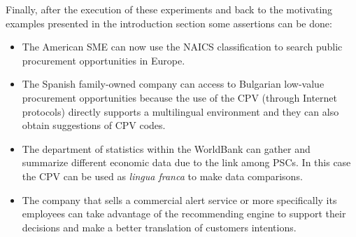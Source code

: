 Finally, after the execution of these experiments and back to the motivating examples 
presented in the introduction section some assertions can be done:
\begin{itemize}
 \item The American SME can now use the NAICS classification to search public procurement 
 opportunities in Europe.
 
 \item The Spanish family-owned company can access to Bulgarian low-value procurement opportunities because the 
 use of the CPV (through Internet protocols) directly supports a multilingual environment and they can also obtain suggestions of CPV codes.
 
 \item The department of statistics within the WorldBank can gather and summarize different economic data due to 
 the link among PSCs. In this case the CPV can be used as \textit{lingua franca} to make data comparisons.
 
 \item The company that sells a commercial alert service or more specifically its employees can take advantage of 
 the recommending engine to support their decisions and make a better translation of customers intentions.
\end{itemize}


